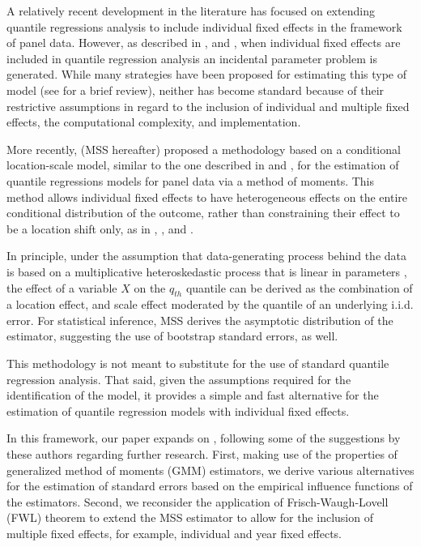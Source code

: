 \documentclass[
  authoryear,
  review,
  1p]{elsarticle}
\begin{document}
A relatively recent development in the literature has focused on
extending quantile regressions analysis to include individual fixed
effects in the framework of panel data. However, as described in
\citet{neymanscott1948}, and \citet{lancaster2000}, when individual
fixed effects are included in quantile regression analysis an incidental
parameter problem is generated. While many strategies have been proposed
for estimating this type of model (see \citet{galvao2017quantile} for a
brief review), neither has become standard because of their restrictive
assumptions in regard to the inclusion of individual and multiple fixed
effects, the computational complexity, and implementation.

More recently, \citet{mss2019} (MSS hereafter) proposed a methodology
based on a conditional location-scale model, similar to the one
described in \citet{he1997} and \citet{zhao2000}, for the estimation of
quantile regressions models for panel data via a method of moments. This
method allows individual fixed effects to have heterogeneous effects on
the entire conditional distribution of the outcome, rather than
constraining their effect to be a location shift only, as in
\citet{canay2011}, \citet{koenker2004}, and \citet{lamarche2010}.

In principle, under the assumption that data-generating process behind
the data is based on a multiplicative heteroskedastic process that is
linear in parameters \citep[\citet{he1997}, \citet{zhao2000},
\citet{cameron2005}]{mss2019}, the effect of a variable \(X\) on the
\(q_{th}\) quantile can be derived as the combination of a location
effect, and scale effect moderated by the quantile of an underlying
i.i.d. error. For statistical inference, MSS derives the asymptotic
distribution of the estimator, suggesting the use of bootstrap standard
errors, as well.

This methodology is not meant to substitute for the use of standard
quantile regression analysis. That said, given the assumptions required
for the identification of the model, it provides a simple and fast
alternative for the estimation of quantile regression models with
individual fixed effects.

In this framework, our paper expands on \citet{mss2019}, following some
of the suggestions by these authors regarding further research. First,
making use of the properties of generalized method of moments (GMM)
estimators, we derive various alternatives for the estimation of
standard errors based on the empirical influence functions of the
estimators. Second, we reconsider the application of Frisch-Waugh-Lovell
(FWL) theorem \citep[ and \citet{lovell1963}]{frishwaugh1933} to extend
the MSS estimator to allow for the inclusion of multiple fixed effects,
for example, individual and year fixed effects.
\end{document}
